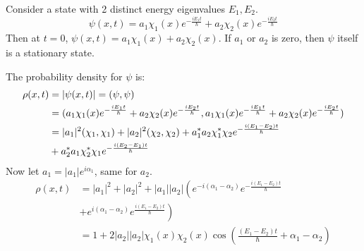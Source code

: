 \documentclass[../Main.tex]{subfiles}
\begin{document}
\begin{example}
    Consider a state with 2 distinct energy eigenvalues $E_1, E_2$.
    \begin{equation*}
        \psi(x, t) = a_1 \chi_1(x) e^{-\frac{iE_1t}{\hbar}} + a_2 \chi_2(x) e^{-\frac{iE_2t}{\hbar}}
    \end{equation*}
    Then at $t = 0$, $\psi(x, t) = a_1 \chi_1(x) + a_2 \chi_2(x)$. If $a_1$ or $a_2$ is zero, then $\psi$ itself is a stationary state.

    The probability density for $\psi$ is:
    \begin{align*}
        \rho(x, t) &= |\psi(x, t)| = (\psi,\psi) \\
        &= (a_1 \chi_1(x) e^{-\frac{iE_1t}{\hbar}} + a_2 \chi_2(x) e^{-\frac{iE_2t}{\hbar}},a_1 \chi_1(x) e^{-\frac{iE_1t}{\hbar}} + a_2 \chi_2(x) e^{-\frac{iE_2t}{\hbar}}) \\
        &= |a_1|^2 (\chi_1,\chi_1) + |a_2|^2 (\chi_2,\chi_2) + a_1^* a_2 \chi_1^* \chi_2 e^{-\frac{i(E_1 - E_2) t}{\hbar}} \\
        &+ a_2^* a_1 \chi_2^* \chi_1 e^{-\frac{i(E_2 - E_1) t}{\hbar}} \\
    \end{align*}
    Now let $a_1 = |a_1|e^{i\alpha_1}$, same for $a_2$.
    \begin{align*}
        \rho(x, t) &= |a_1|^2 + |a_2|^2 + |a_1||a_2|\left(e^{-i(\alpha_1 - \alpha_2)} e^{-\frac{i(E_1 - E_2)t}{\hbar}}\right. \\
        &\left.+ e^{i(\alpha_1 - \alpha_2)}e^{\frac{i(E_1 - E_2)t}{\hbar}}\right) \\
        &= 1 + 2|a_2||a_2|\chi_1(x) \chi_2(x) \cos\left(\frac{(E_1 - E_2)t}{\hbar} + \alpha_1 - \alpha_2\right)
    \end{align*}
\end{example}
\end{document}
